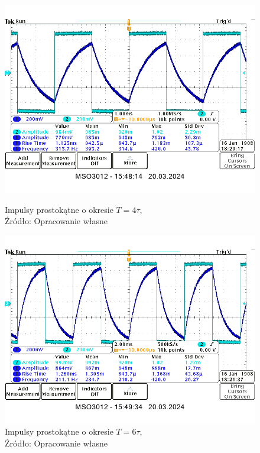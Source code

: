 \documentclass{article}
\begin{document}
    \begin{figure}[!ht]
      \centering
      \begin{minipage}{.4\textwidth}
        \centering
        \includegraphics[scale=0.3]{grafiki/4t.png}
        \caption{Impulsy prostokątne o okresie $T = 4 \tau$,
          \\Źródło: Opracowanie własne}
      \end{minipage}
      \begin{minipage}{.4\textwidth}
        \centering
        \includegraphics[scale=0.3]{grafiki/6t.png}
        \caption{Impulsy prostokątne o okresie $T = 6 \tau$,
        \\Źródło: Opracowanie własne}
      \end{minipage}
    \end{figure}
\end{document}
